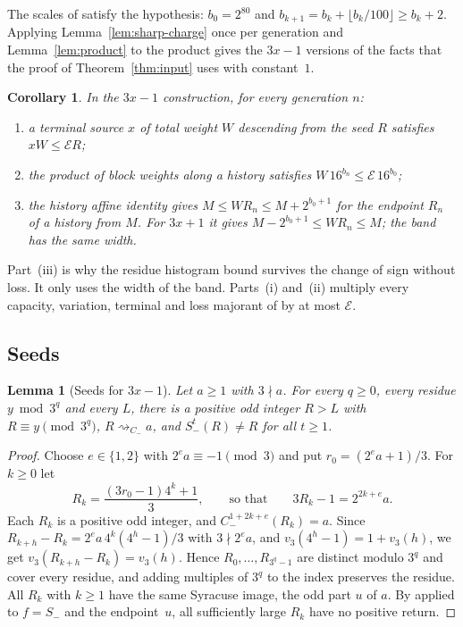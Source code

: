\documentclass[11pt]{amsart}
\newtheorem{lemma}[theorem]{Lemma}
\newtheorem{corollary}[theorem]{Corollary}
\theoremstyle{definition}
\theoremstyle{remark}
\newcommand{\Cm}{C_{-}}
\newcommand{\Sm}{S_{-}}
\newcommand{\reach}[1]{\mathrel{\rightsquigarrow_{#1}}}
\newcommand{\E}{\mathcal{E}}
\begin{document}
The scales of \cite[\S3]{MazurM1} satisfy the hypothesis: $b_0=2^{80}$ and $b_{k+1}=b_k+\lfloor b_k/100\rfloor\ge
b_k+2$. Applying Lemma~\ref{lem:sharp-charge} once per generation and Lemma~\ref{lem:product} to
the product gives the $3x-1$ versions of the facts that the proof of Theorem~\ref{thm:input} uses with constant~$1$.

\begin{corollary}\label{cor:telescope}
In the $3x-1$ construction, for every generation $n$:
\begin{enumerate}[leftmargin=*,label=(\roman*)]
\item a terminal source $x$ of total weight $W$ descending from the seed $R$ satisfies
  $xW\le\E R$;
\item the product of block weights along a history satisfies $W\,16^{b_n}\le\E\,16^{b_0}$;
\item the history affine identity gives $M\le W R_n\le M+2^{b_0+1}$ for the endpoint $R_n$ of a
  history from $M$. For $3x+1$ it gives $M-2^{b_0+1}\le WR_n\le M$; the band has the same width.
\end{enumerate}
\end{corollary}

Part~(iii) is why the residue histogram bound \cite[(3.9)]{MazurM1} survives the change of sign
without loss. It only uses the width of the band. Parts~(i) and~(ii) multiply every capacity,
variation, terminal and loss majorant of \cite[\S\S3, 5, 8]{MazurM1} by at most $\E$.

\subsection{Seeds}

\begin{lemma}[Seeds for $3x-1$]\label{lem:seeds}
Let $a\ge1$ with $3\nmid a$. For every $q\ge0$, every residue $y\bmod3^{q}$ and every $L$, there is
a positive odd integer $R>L$ with $R\equiv y\pmod{3^q}$, $R\reach{\Cm}a$, and $\Sm^{t}(R)\ne R$ for
all $t\ge1$.
\end{lemma}

\begin{proof}
Choose $e\in\{1,2\}$ with $2^{e}a\equiv-1\pmod3$ and put $r_0=(2^{e}a+1)/3$. For $k\ge0$ let
\[
  R_k=\frac{(3r_0-1)4^{k}+1}{3},\qquad\text{so that}\qquad 3R_k-1=2^{2k+e}a .
\]
Each $R_k$ is a positive odd integer, and $\Cm^{1+2k+e}(R_k)=a$. Since
$R_{k+h}-R_k=2^{e}a\,4^{k}(4^{h}-1)/3$ with $3\nmid 2^{e}a$, and
$v_3(4^{h}-1)=1+v_3(h)$, we get $v_3(R_{k+h}-R_k)=v_3(h)$. Hence $R_0,\dots,R_{3^q-1}$ are
distinct modulo $3^{q}$ and cover every residue, and adding multiples of $3^{q}$ to the index
preserves the residue. All $R_k$ with $k\ge1$ have the same Syracuse image, the odd part $u$ of $a$.
By \cite[Lemma~2.1]{MazurM2} applied to $f=\Sm$ and the endpoint~$u$, all sufficiently large $R_k$
have no positive return.
\end{proof}
\end{document}
